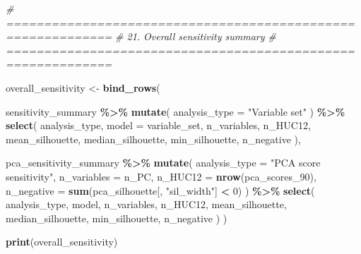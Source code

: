\documentclass[
]{article}
\newenvironment{Shaded}{\begin{snugshade}}{\end{snugshade}}
\newcommand{\AttributeTok}[1]{\textcolor[rgb]{0.13,0.29,0.53}{#1}}
\newcommand{\CommentTok}[1]{\textcolor[rgb]{0.56,0.35,0.01}{\textit{#1}}}
\newcommand{\DecValTok}[1]{\textcolor[rgb]{0.00,0.00,0.81}{#1}}
\newcommand{\FunctionTok}[1]{\textcolor[rgb]{0.13,0.29,0.53}{\textbf{#1}}}
\newcommand{\NormalTok}[1]{#1}
\newcommand{\OtherTok}[1]{\textcolor[rgb]{0.56,0.35,0.01}{#1}}
\newcommand{\SpecialCharTok}[1]{\textcolor[rgb]{0.81,0.36,0.00}{\textbf{#1}}}
\newcommand{\StringTok}[1]{\textcolor[rgb]{0.31,0.60,0.02}{#1}}
\begin{document}
\begin{Shaded}
\begin{Highlighting}[]
\CommentTok{\# ============================================================}
\CommentTok{\# 21. Overall sensitivity summary}
\CommentTok{\# ============================================================}

\NormalTok{overall\_sensitivity }\OtherTok{\textless{}{-}} \FunctionTok{bind\_rows}\NormalTok{(}

\NormalTok{  sensitivity\_summary }\SpecialCharTok{\%\textgreater{}\%}
    \FunctionTok{mutate}\NormalTok{(}
      \AttributeTok{analysis\_type =} \StringTok{"Variable set"}
\NormalTok{    ) }\SpecialCharTok{\%\textgreater{}\%}
    \FunctionTok{select}\NormalTok{(}
\NormalTok{      analysis\_type,}
      \AttributeTok{model =}\NormalTok{ variable\_set,}
\NormalTok{      n\_variables,}
\NormalTok{      n\_HUC12,}
\NormalTok{      mean\_silhouette,}
\NormalTok{      median\_silhouette,}
\NormalTok{      min\_silhouette,}
\NormalTok{      n\_negative}
\NormalTok{    ),}

\NormalTok{  pca\_sensitivity\_summary }\SpecialCharTok{\%\textgreater{}\%}
    \FunctionTok{mutate}\NormalTok{(}
      \AttributeTok{analysis\_type =} \StringTok{"PCA score sensitivity"}\NormalTok{,}
      \AttributeTok{n\_variables =}\NormalTok{ n\_PC,}
      \AttributeTok{n\_HUC12 =} \FunctionTok{nrow}\NormalTok{(pca\_scores\_90),}
      \AttributeTok{n\_negative =}
        \FunctionTok{sum}\NormalTok{(pca\_silhouette[, }\StringTok{"sil\_width"}\NormalTok{] }\SpecialCharTok{\textless{}} \DecValTok{0}\NormalTok{)}
\NormalTok{    ) }\SpecialCharTok{\%\textgreater{}\%}
    \FunctionTok{select}\NormalTok{(}
\NormalTok{      analysis\_type,}
\NormalTok{      model,}
\NormalTok{      n\_variables,}
\NormalTok{      n\_HUC12,}
\NormalTok{      mean\_silhouette,}
\NormalTok{      median\_silhouette,}
\NormalTok{      min\_silhouette,}
\NormalTok{      n\_negative}
\NormalTok{    )}
\NormalTok{)}

\FunctionTok{print}\NormalTok{(overall\_sensitivity)}
\end{Highlighting}
\end{Shaded}
\end{document}
